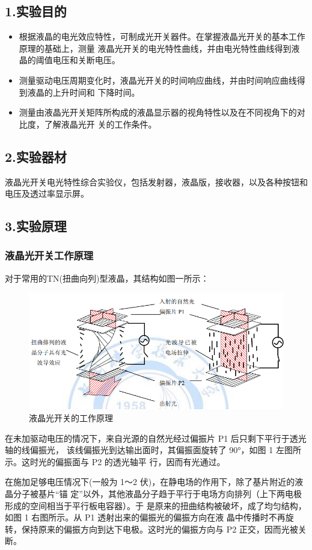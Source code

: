 \documentclass[utf8]{ctexart}
\begin{document}
	
	\subsection*{1.实验目的}	
	\begin{itemize}
		\item  根据液晶的电光效应特性，可制成光开关器件。在掌握液晶光开关的基本工作原理的基础上，测量
		液晶光开关的电光特性曲线，并由电光特性曲线得到液晶的阈值电压和关断电压。
		\item  测量驱动电压周期变化时，液晶光开关的时间响应曲线，并由时间响应曲线得到液晶的上升时间和
		下降时间。
		\item  测量由液晶光开关矩阵所构成的液晶显示器的视角特性以及在不同视角下的对比度，了解液晶光开
		关的工作条件。
	\end{itemize}
	\subsection*{2.实验器材} 
	液晶光开关电光特性综合实验仪，包括发射器，液晶版，接收器，以及各种按钮和电压及透过率显示屏。
	\subsection*{3.实验原理}
	\subsubsection*{液晶光开关工作原理}
	对于常用的TN(扭曲向列)型液晶，其结构如图一所示：
	\begin{figure}[htbp]
		\centering
		\includegraphics[scale=0.8]{1.png}
		\caption{液晶光开关的工作原理}
	\end{figure}
	在未加驱动电压的情况下，来自光源的自然光经过偏振片 P1 后只剩下平行于透光轴的线偏振光，
	该线偏振光到达输出面时，其偏振面旋转了 90°，如图 1 左图所示。这时光的偏振面与 P2 的透光轴平
	行，因而有光通过。

	在施加足够电压情况下(一般为 1～2 伏)，在静电场的作用下，除了基片附近的液晶分子被基片“锚
	定”以外，其他液晶分子趋于平行于电场方向排列（上下两电极形成的空间相当于平行板电容器）。于
	是原来的扭曲结构被破坏，成了均匀结构，如图 1 右图所示。从 P1 透射出来的偏振光的偏振方向在液
	晶中传播时不再旋转，保持原来的偏振方向到达下电极。这时光的偏振方向与 P2 正交，因而光被关断。
\end{document}
